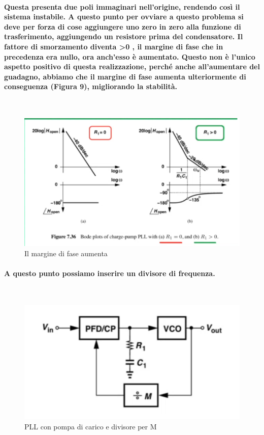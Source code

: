 \documentclass{article}
\begin{document}
\paragraph{Questa presenta due poli immaginari nell'origine, rendendo così il sistema instabile. A questo punto per ovviare a questo problema si deve per forza di cose aggiungere uno zero in zero alla funzione di trasferimento, aggiungendo un resistore prima del condensatore.
Il fattore di smorzamento diventa >0 , il margine di fase che in precedenza era nullo, ora anch'esso è aumentato.  
Questo non è l'unico aspetto positivo di questa realizzazione, perché anche all'aumentare del guadagno, abbiamo che il margine di fase aumenta ulteriormente di conseguenza (Figura 9), migliorando la stabilità.}
~\begin{figure}[!h]%
\includegraphics[scale=0.8]{ZPFD.png} 
\caption{Il margine di fase aumenta}
\label{fig:foo}
\end{figure}
\paragraph{A questo punto possiamo inserire un divisore di frequenza.}
~\begin{figure}[!h]%
\includegraphics[scale=0.6]{DivM.png} 
\caption{PLL con pompa di carico e divisore per M}
\label{fig:foo}
\end{figure}
\end{document}

